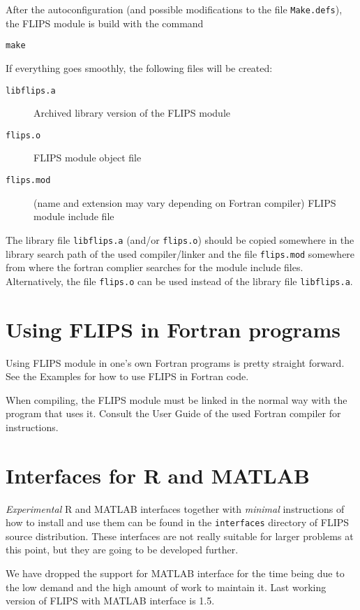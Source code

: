\documentclass[a4paper,twoside]{refrep}
\newcommand{\aitem}[1]{\item[{\tt #1}]}
\newenvironment{arglist}
	{\begin{description}}
	{\end{description}}
\begin{document}

After the autoconfiguration (and possible modifications to the file \verb!Make.defs!), the FLIPS module is build with the command
\begin{verbatim}
make
\end{verbatim}

If everything goes smoothly, the following files will be created:
\begin{arglist}
\aitem{libflips.a} Archived library version of the FLIPS module
\aitem{flips.o} FLIPS module object file
\aitem{flips.mod} (name and extension may vary depending on Fortran compiler) FLIPS module include file
\end{arglist}

The library file \verb!libflips.a! (and/or \verb!flips.o!) should be copied somewhere in the library search path of the used compiler/linker and the file \verb!flips.mod! somewhere from where the fortran complier searches for the module include files. Alternatively, the file \verb!flips.o! can be used instead of the library file \verb!libflips.a!.



\chapter{Using FLIPS in Fortran programs}

Using FLIPS module in one's own Fortran programs is pretty straight forward. See the Examples for how to use FLIPS in Fortran code. 

When compiling, the FLIPS module must be linked in the normal way with the program that uses it. Consult the User Guide of the used Fortran compiler for instructions.

\chapter{Interfaces for R and MATLAB}

\emph{Experimental} R and MATLAB interfaces together with \emph{minimal} instructions of how to install and use them can be found in the \verb!interfaces! directory of FLIPS source distribution. These interfaces are not really suitable for larger problems at this point, but they are going to be developed further.

\attention We have dropped the support for MATLAB interface for the time being due to the low demand and the high amount of work to maintain it. Last working version of FLIPS with MATLAB interface is 1.5. 
\end{document}
